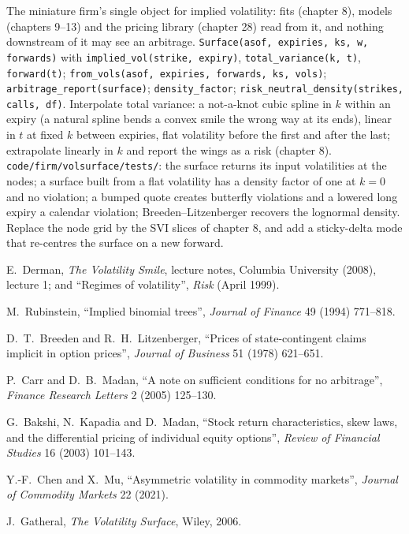 \begin{build}
 The miniature firm's single object for implied volatility: fits (chapter 8),
models (chapters 9--13) and the pricing library (chapter 28) read from it, and nothing downstream
of it may see an arbitrage.
 \texttt{Surface(asof, expiries, ks, w, forwards)} with
\texttt{implied\_vol(strike, expiry)}, \texttt{total\_variance(k, t)}, \texttt{forward(t)};
\texttt{from\_vols(asof, expiries, forwards, ks, vols)}; \texttt{arbitrage\_report(surface)};
\texttt{density\_factor}; \texttt{risk\_neutral\_density(strikes, calls, df)}.
 Interpolate total variance: a not-a-knot cubic spline in $k$ within an expiry
(a natural spline bends a convex smile the wrong way at its ends), linear in $t$ at fixed $k$
between expiries, flat volatility before the first and after the last; extrapolate linearly in
$k$ and report the wings as a risk (chapter 8).
 \texttt{code/firm/volsurface/tests/}: the surface returns its input
volatilities at the nodes; a surface built from a flat volatility has a density factor of one
at $k=0$ and no violation; a bumped quote creates butterfly violations and a lowered long
expiry a calendar violation; Breeden--Litzenberger recovers the lognormal density.
 Replace the node grid by the SVI slices of chapter 8, and add a sticky-delta
mode that re-centres the surface on a new forward.
\end{build}

\begin{omsources}
\item E.~Derman, \emph{The Volatility Smile}, lecture notes, Columbia University (2008),
lecture 1; and ``Regimes of volatility'', \emph{Risk} (April 1999).
\item M.~Rubinstein, ``Implied binomial trees'', \emph{Journal of Finance} 49 (1994) 771--818.
\item D.~T.~Breeden and R.~H.~Litzenberger, ``Prices of state-contingent claims implicit in
option prices'', \emph{Journal of Business} 51 (1978) 621--651.
\item P.~Carr and D.~B.~Madan, ``A note on sufficient conditions for no arbitrage'',
\emph{Finance Research Letters} 2 (2005) 125--130.
\item G.~Bakshi, N.~Kapadia and D.~Madan, ``Stock return characteristics, skew laws, and the
differential pricing of individual equity options'', \emph{Review of Financial Studies} 16
(2003) 101--143.
\item Y.-F.~Chen and X.~Mu, ``Asymmetric volatility in commodity markets'', \emph{Journal of
Commodity Markets} 22 (2021).
\item J.~Gatheral, \emph{The Volatility Surface}, Wiley, 2006.
\end{omsources}

